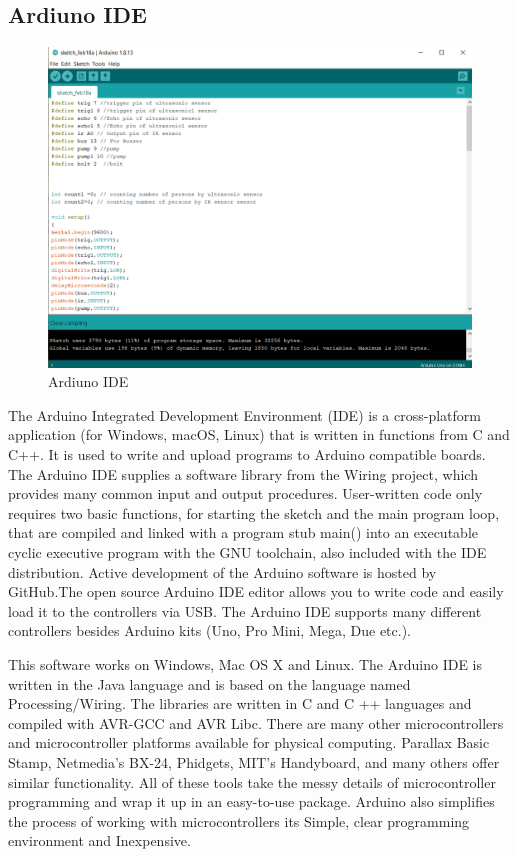 \subsection{Ardiuno IDE}

\begin{figure}[h]
		\centering
	\includegraphics[width=120mm,scale=1]{49}
	\caption{Ardiuno IDE}
	\label{Ardiuno IDE}
	
\end{figure}

The Arduino Integrated Development Environment (IDE) is a cross-platform application (for Windows, macOS, Linux) that is written in functions from C and C++. It is used to write and upload programs to Arduino compatible boards. The Arduino IDE supplies a software library from the Wiring project, which provides
many common input and output procedures. User-written code only requires two basic functions, for starting the sketch and the main program loop, that are compiled and linked with a program stub main() into an executable cyclic executive program with the GNU toolchain, also included with the IDE distribution. Active development of the Arduino software is hosted by GitHub.The open source Arduino IDE editor allows you to write code and easily load it to the controllers via USB. The Arduino IDE supports many different   controllers besides Arduino kits (Uno, Pro Mini, Mega, Due etc.).

This software works on Windows, Mac OS X and Linux. The Arduino IDE is written in the Java language and is based on the language named Processing/Wiring. The libraries are written in C and C ++ languages and compiled with AVR-GCC and AVR Libc. There are many other microcontrollers and microcontroller platforms available for physical computing. Parallax Basic Stamp, Netmedia’s BX-24, Phidgets, MIT’s Handyboard, and many others offer similar functionality. All of these tools take the messy details of microcontroller programming and wrap it up in an easy-to-use package. Arduino also simplifies the process of working with microcontrollers its Simple, clear programming environment and Inexpensive.

